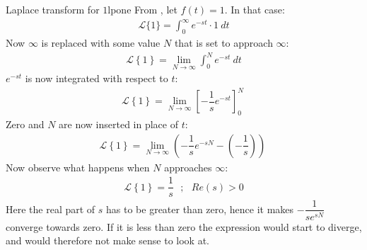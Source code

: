 \begin{example}{Laplace transform for $1$}{lpone}
From , let $f(t)=1$. In that case:
\begin{align*}
\mathcal{L}\{1\}=\int_{0}^{\infty} e^{-st} \cdot 1\ dt
\end{align*}
Now $\infty$ is replaced with some value $N$ that is set to approach $\infty$:
\begin{align*}
\mathcal{L} \left\{1 \right\}= \lim_{N \to \infty}  \int_{0}^{N} e^{-st}\ dt
\end{align*}
$e^{-st}$ is now integrated with respect to $t$:
\begin{align*}
\mathcal{L} \left\{1 \right\}= \lim_{N \to \infty} \left[ -\dfrac{1}{s} e^{-st} \right]_{0}^{N} \ 
\end{align*}
Zero and $N$ are now inserted in place of $t$:
\begin{align*}
\mathcal{L} \left\{1 \right\}= \lim_{N \to \infty} \left( -\dfrac{1}{s} e^{-sN} - \left(-\dfrac{1}{s}\right) \right) \ 
\end{align*}
Now observe what happens when $N$ approaches $\infty$:
\begin{align*}
\mathcal{L} \left\{1 \right\}=\dfrac{1}{s} \ \ \ ; \ \ \ Re(s) > 0
\end{align*}
Here the real part of $s$ has to be greater than zero, hence it makes $-\dfrac{1}{se^{sN}}$ converge towards zero. If it is less than zero the expression would start to diverge, and would therefore not make sense to look at.
\end{example}

